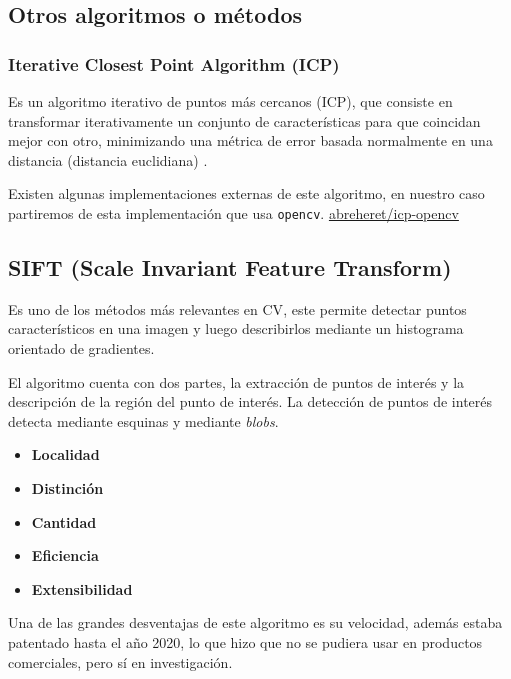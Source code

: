 \subsection{Otros algoritmos o métodos}
\subsubsection{Iterative Closest Point Algorithm (ICP)}
Es un algoritmo iterativo de puntos más cercanos (\acrfull{ICP}), que consiste en transformar iterativamente un conjunto de características para que coincidan mejor con otro, minimizando una métrica de error basada normalmente en una distancia (distancia euclidiana) \cite{Salhi2019}.

Existen algunas implementaciones externas de este algoritmo, en nuestro caso partiremos de esta implementación que usa \texttt{opencv}. \href{https://github.com/abreheret/icp-opencv}{abreheret/icp-opencv}




\subsection*{SIFT (Scale Invariant Feature Transform)}
Es uno de los métodos más relevantes en \acrshort{CV}, este permite detectar puntos característicos en una imagen y luego describirlos mediante un histograma orientado de gradientes. \cite{sift}

El algoritmo cuenta con dos partes, la extracción de puntos de interés y la descripción de la región del punto de interés. La detección de puntos de interés detecta mediante esquinas y mediante \textit{blobs}.

\begin{itemize}
    \item \textbf{Localidad}
    \item \textbf{Distinción}
    \item \textbf{Cantidad}
    \item \textbf{Eficiencia}
    \item \textbf{Extensibilidad}
\end{itemize}

Una de las grandes desventajas de este algoritmo es su velocidad, además estaba patentado hasta el año 2020, lo que hizo que no se pudiera usar en productos comerciales, pero sí en investigación.


